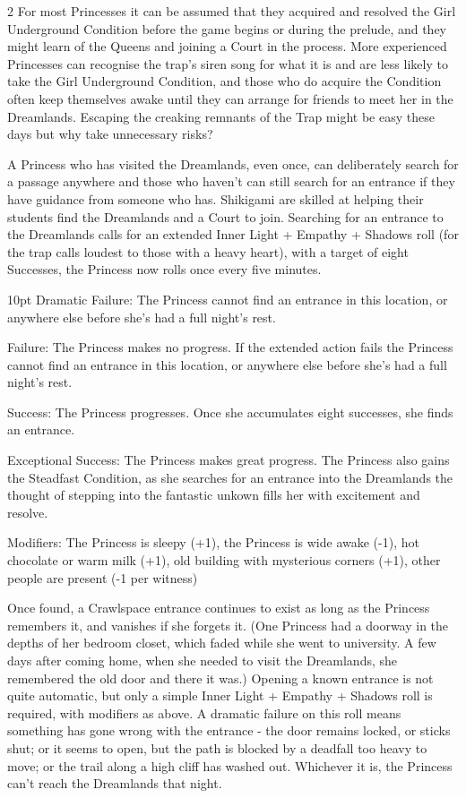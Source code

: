 \begin{multicols}{2}
For most Princesses it can be assumed that they acquired and resolved the Girl Underground Condition before the game begins or during the prelude, and they might learn of the Queens and joining a Court in the process. More experienced Princesses can recognise the trap's siren song for what it is and are less likely to take the Girl Underground Condition, and those who do acquire the Condition often keep themselves awake until they can arrange for friends to meet her in the Dreamlands. Escaping the creaking remnants of the Trap might be easy these days but why take unnecessary risks?

A Princess who has visited the Dreamlands, even once, can deliberately search for a passage anywhere and those who haven't can still search for an entrance if they have guidance from someone who has. Shikigami are skilled at helping their students find the Dreamlands and a Court to join. Searching for an entrance to the Dreamlands calls for an extended Inner Light + Empathy + Shadows roll (for the trap calls loudest to those with a heavy heart), with a target of eight Successes, the Princess now rolls once every five minutes.

\begin{myindentpar}{10pt}    Dramatic Failure: The Princess cannot find an entrance in this location, or anywhere else before she's had a full night's rest.
    
    Failure: The Princess makes no progress. If the extended action fails the Princess cannot find an entrance in this location, or anywhere else before she's had a full night's rest.
    
    Success: The Princess progresses. Once she accumulates eight successes, she finds an entrance.
    
    Exceptional Success: The Princess makes great progress. The Princess also gains the Steadfast Condition, as she searches for an entrance into the Dreamlands the thought of stepping into the fantastic unkown fills her with excitement and resolve. 
    
    Modifiers: The Princess is sleepy (+1), the Princess is wide awake (-1), hot chocolate or warm milk (+1), old building with mysterious corners (+1), other people are present (-1 per witness)\end{myindentpar}

Once found, a Crawlspace entrance continues to exist as long as the Princess remembers it, and vanishes if she forgets it. (One Princess had a doorway in the depths of her bedroom closet, which faded while she went to university. A few days after coming home, when she needed to visit the Dreamlands, she remembered the old door and there it was.) Opening a known entrance is not quite automatic, but only a simple Inner Light + Empathy + Shadows roll is required, with modifiers as above. A dramatic failure on this roll means something has gone wrong with the entrance - the door remains locked, or sticks shut; or it seems to open, but the path is blocked by a deadfall too heavy to move; or the trail along a high cliff has washed out. Whichever it is, the Princess can't reach the Dreamlands that night.


\end{multicols}
